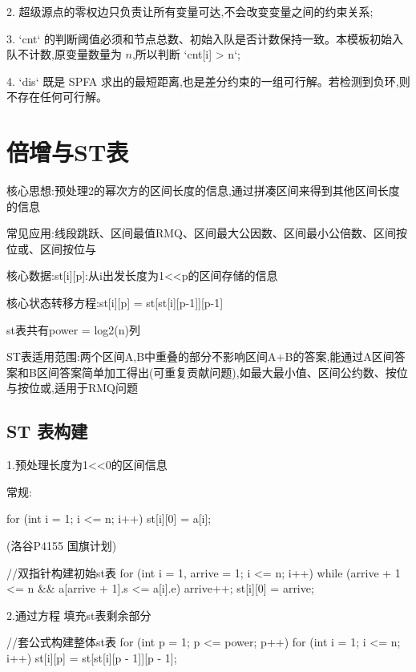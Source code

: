 \documentclass[UTF8,a4paper,11pt]{ctexart}
\newcommand{\topic}[1]{%
  \par\needspace{3\baselineskip}\vspace{0.45em}%
  \noindent{\bfseries\color{Primary}#1}\par\vspace{0.12em}%
}
\begin{document}
2. 超级源点的零权边只负责让所有变量可达,不会改变变量之间的约束关系;

3. `cnt` 的判断阈值必须和节点总数、初始入队是否计数保持一致。本模板初始入队不计数,原变量数量为 $n$,所以判断 `cnt[i] > n`;

4. `dis` 既是 SPFA 求出的最短距离,也是差分约束的一组可行解。若检测到负环,则不存在任何可行解。

\section{倍增与ST表}

\topic{核心思想与适用范围}

核心思想:预处理2的幂次方的区间长度的信息,通过拼凑区间来得到其他区间长度的信息

常见应用:线段跳跃、区间最值RMQ、区间最大公因数、区间最小公倍数、区间按位或、区间按位与

核心数据:st[i][p]:从i出发长度为1<<p的区间存储的信息

核心状态转移方程:st[i][p] = st[st[i][p-1]][p-1]

st表共有power = log2(n)列

ST表适用范围:两个区间A,B中重叠的部分不影响区间A+B的答案,能通过A区间答案和B区间答案简单加工得出(可重复贡献问题),如最大最小值、区间公约数、按位与按位或,适用于RMQ问题

\subsection{ST 表构建}

1.预处理长度为1<<0的区间信息

常规:

\begin{CodeBlock}
for (int i = 1; i <= n; i++)
    st[i][0] = a[i];
\end{CodeBlock}

(洛谷P4155 国旗计划)

\begin{CodeBlock}
//双指针构建初始st表
for (int i = 1, arrive = 1; i <= n; i++) {
    while (arrive + 1 <= n && a[arrive + 1].s <= a[i].e)
        arrive++;
    st[i][0] = arrive;
}
\end{CodeBlock}

2.通过方程 填充st表剩余部分

\begin{CodeBlock}
//套公式构建整体st表
for (int p = 1; p <= power; p++) {
    for (int i = 1; i <= n; i++)
        st[i][p] = st[st[i][p - 1]][p - 1];
}
\end{CodeBlock}
\end{document}
